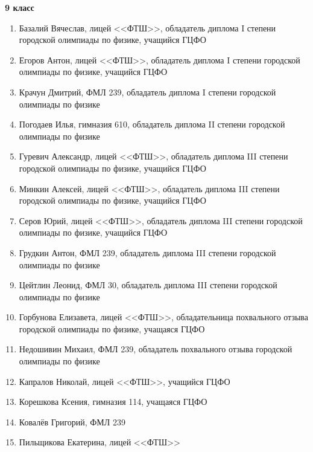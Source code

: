 \textbf{9 класс}
\begin{enumerate}
\item Базалий Вячеслав, лицей <<ФТШ>>, обладатель диплома I степени городской олимпиады по физике, учащийся ГЦФО
\item Егоров Антон, лицей <<ФТШ>>, обладатель диплома I степени городской олимпиады по физике, учащийся ГЦФО
\item Крачун Дмитрий, ФМЛ 239, обладатель диплома I степени городской олимпиады по физике
\item Погодаев Илья, гимназия 610, обладатель диплома II степени городской олимпиады по физике
\item Гуревич Александр, лицей <<ФТШ>>, обладатель диплома III степени городской олимпиады по физике, учащийся ГЦФО
\item Минкин Алексей, лицей <<ФТШ>>, обладатель диплома III степени городской олимпиады по физике, учащийся ГЦФО
\item Серов Юрий, лицей <<ФТШ>>, обладатель диплома III степени городской олимпиады по физике, учащийся ГЦФО
\item Грудкин Антон, ФМЛ 239, обладатель диплома III степени городской олимпиады по физике
\item Цейтлин Леонид, ФМЛ 30, обладатель диплома III степени городской олимпиады по физике
\item Горбунова Елизавета, лицей <<ФТШ>>, обладательница похвального отзыва городской олимпиады по физике, учащаяся ГЦФО
\item Недошивин Михаил, ФМЛ 239, обладатель похвального отзыва городской олимпиады по физике
\item Капралов Николай, лицей <<ФТШ>>, учащийся ГЦФО
\item Корешкова Ксения, гимназия 114, учащаяся ГЦФО
\item Ковалёв Григорий, ФМЛ 239
\item Пильщикова Екатерина, лицей <<ФТШ>>
\end{enumerate}
